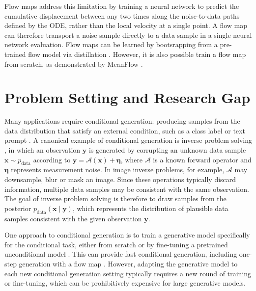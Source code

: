 \documentclass[12pt,a4paper]{report}
\begin{document}
Flow maps \parencite{boffi2025flowmapmatchingstochastic,boffi2025buildconsistencymodellearning} address this limitation by training a neural network to predict the cumulative displacement between any two times along the noise-to-data paths defined by the ODE, rather than the local velocity at a single point. 
A flow map can therefore transport a noise sample directly to a data sample in a single neural network evaluation. 
Flow maps can be learned by bootsrapping from a pre-trained flow model via distillation \parencite{song2023consistencymodels,boffi2025flowmapmatchingstochastic}. However, it is also possible train a flow map from scratch, as demonstrated by MeanFlow \parencite{geng2025meanflowsonestepgenerative}. 

\section{Problem Setting and Research Gap}
\label{sec:problem_setting_and_research_gap}
Many applications require conditional generation: producing samples from the data distribution that satisfy an external condition, such as a class label or text prompt \parencite{dhariwal2021diffusionmodelsbeatgans,ho2022classifierfreediffusionguidance,rombach2022highresolutionimagesynthesislatent}. A canonical example of conditional generation is inverse problem solving \parencite{ongie2020deeplearningtechniquesinverse}, in which an observation \(\mathbf{y}\) is generated by corrupting an unknown data sample \(\mathbf{x}\sim p_{\mathrm{data}}\) according to $\mathbf{y}=\mathcal{A}(\mathbf{x})+\boldsymbol{\eta}$, where \(\mathcal{A}\) is a known forward operator and \(\boldsymbol{\eta}\) represents measurement noise. In image inverse problems, for example, \(\mathcal{A}\) may downsample, blur or mask an image. Since these operations typically discard information, multiple data samples may be consistent with the same observation. The goal of inverse problem solving is therefore to draw samples from the posterior \(p_{\mathrm{data}}(\mathbf{x}\mid\mathbf{y})\), which represents the distribution of plausible data samples consistent with the given observation \(\mathbf{y}\).

One approach to conditional generation is to train a generative model specifically for the conditional task, either from scratch or by fine-tuning a pretrained unconditional model \parencite{ho2022classifierfreediffusionguidance,meng2023distillationguideddiffusionmodels}. This can provide fast conditional generation, including one-step generation with a flow map \parencite{geng2025meanflowsonestepgenerative,chen2025visualgenerationguidance}. However, adapting the generative model to each new conditional generation setting typically requires a new round of training or fine-tuning, which can be prohibitively expensive for large generative models.
\end{document}
